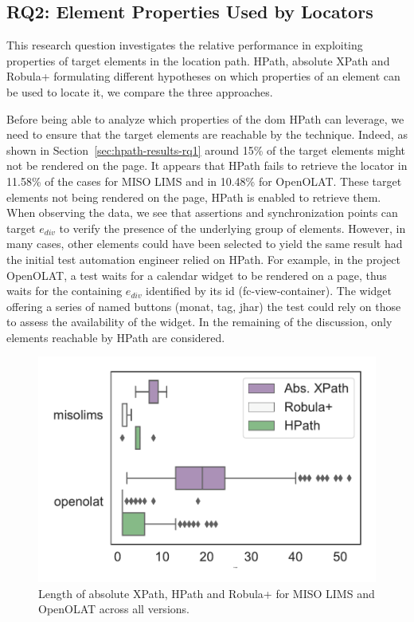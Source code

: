 \subsection{RQ2: Element Properties Used by Locators}
\label{sec:hpath-results-rq2}

This research question investigates the relative performance in exploiting properties of target elements in the location path. HPath, absolute XPath and Robula+ formulating different hypotheses on which properties of an element can be used to locate it, we compare the three approaches.

Before being able to analyze which properties of the \gls{dom} HPath can leverage, we need to ensure that the target elements are reachable by the technique. Indeed, as shown in Section~\ref{sec:hpath-results-rq1} around 15\% of the target elements might not be rendered on the page. It appears that HPath fails to retrieve the locator in 11.58\% of the cases for MISO LIMS and in 10.48\% for OpenOLAT. These target elements not being rendered on the page, HPath is enabled to retrieve them. When observing the data, we see that assertions and synchronization points can target $e_{div}$ to verify the presence of the underlying group of elements. However, in many cases, other elements could have been selected to yield the same result had the initial test automation engineer relied on HPath. For example, in the project OpenOLAT, a test waits for a calendar widget to be rendered on a page, thus waits for the containing $e_{div}$ identified by its id (fc-view-container). The widget offering a series of named buttons (monat, tag, jhar) the test could rely on those to assess the availability of the widget. In the remaining of the discussion, only elements reachable by HPath are considered.

\begin{figure}
\centering
\includegraphics[width=0.6\columnwidth]{figures/hpath/canonical-selector-complexity-dist.pdf}
\caption{Length of absolute XPath, HPath and Robula+ for MISO LIMS and OpenOLAT across all versions.}  
\label{fig:hpath-results-lengths}
\end{figure}

